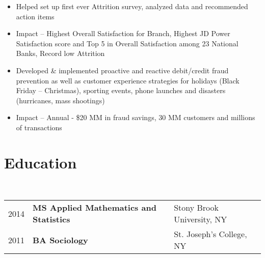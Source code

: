 \documentclass[a4paper,11pt]{article}
\begin{document}
\begin{itemize}
\item Helped set up first ever Attrition survey, analyzed data and recommended action items 
\item Impact – Highest Overall Satisfaction for Branch, Highest JD Power Satisfaction score and Top 5 in Overall Satisfaction among 23 National Banks, Record low Attrition
\item Developed \& implemented proactive and reactive debit/credit fraud prevention as well as customer experience strategies for holidays (Black Friday – Christmas), sporting events, phone launches and disasters (hurricanes, mass shootings) 
\item Impact – Annual - \$20 MM in fraud savings, 30 MM customers and millions of transactions
\end{itemize}

\section{Education}

~\begin{tabular}{lll}
2014 &\textbf{MS Applied Mathematics and Statistics} & Stony Brook University, NY\\
2011 &\textbf{ BA Sociology} & St. Joseph's College, NY
\end{tabular}

\enlargethispage*{0.9cm}

\setlength{\bibitemsep}{1.8pt}
\end{document}
